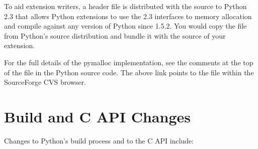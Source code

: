 \documentclass{howto}
\begin{document}
To aid extension writers, a header file  is
distributed with the source to Python 2.3 that allows Python
extensions to use the 2.3 interfaces to memory allocation and compile
against any version of Python since 1.5.2.  You would copy the file
from Python's source distribution and bundle it with the source of
your extension.

\begin{seealso}

{For the full details of the pymalloc implementation, see
the comments at the top of the file  in the
Python source code.  The above link points to the file within the
SourceForge CVS browser.}

\end{seealso}


\section{Build and C API Changes}

Changes to Python's build process and to the C API include:
\end{document}
